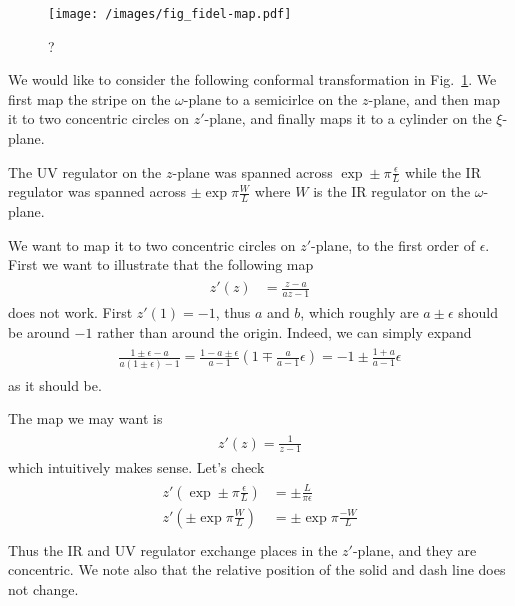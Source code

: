 \documentclass{article}
\begin{document}
\begin{figure}
\centering
\texttt{[image: /images/fig\_fidel-map.pdf]}
\caption{?}
\label{fig:Conformal_transformation}
\end{figure}

We would like to consider the following conformal transformation in Fig.~\ref{fig:Conformal_transformation}. We first map the stripe on the $\omega$-plane to a semicirlce on the $z$-plane, and then map it to two concentric circles on $z'$-plane, and finally maps it to a cylinder on the $\xi$-plane. 

The UV regulator on the $z$-plane was spanned across $\exp\pm\pi\frac{\epsilon}{L}$ while the IR regulator was spanned across $\pm \exp\pi\frac{W}{L}$ where $W$ is the IR regulator on the $\omega$-plane. 

We want to map it to two concentric circles on $z'$-plane, to the first order of $\epsilon$. First we want to illustrate that the following map
\begin{eqnarray}\begin{aligned}
z'(z)&=\frac{z-a}{az-1}
\end{aligned}\end{eqnarray}
does not work. First $z'(1)=-1$, thus $a$ and $b$, which roughly are $a\pm\epsilon$ should be around $-1$ rather than around the origin. Indeed, we can simply expand
\begin{eqnarray}\begin{aligned}
\frac{1\pm\epsilon-a}{a(1\pm\epsilon)-1} = \frac{1-a\pm\epsilon}{a-1}\left(1\mp\frac{a}{a-1}\epsilon\right) = -1\pm\frac{1+a}{a-1}\epsilon
\end{aligned}\end{eqnarray}
as it should be.

The map we may want is 
\begin{eqnarray}\begin{aligned}
z'(z) = \frac{1}{z-1}
\end{aligned}\end{eqnarray}
which intuitively makes sense. Let's check
\begin{eqnarray}\begin{aligned}
z'(\exp\pm\pi\frac{\epsilon}{L}) &= \pm\frac{L}{\pi\epsilon} \\
z'(\pm\exp\pi\frac{W}{L}) &= \pm\exp\pi\frac{-W}{L} \\
\end{aligned}\end{eqnarray}
Thus the IR and UV regulator exchange places in the $z'$-plane, and they are concentric. We note also that the relative position of the solid and dash line does not change. 
\end{document}
